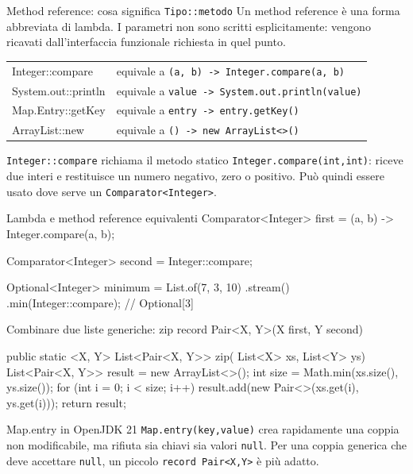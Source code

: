 ﻿\documentclass[10pt,a4paper]{article}
\newcommand{\cmd}[1]{\texttt{#1}}
\begin{document}
\begin{concept}{Method reference: cosa significa \texttt{Tipo::metodo}}
Un method reference è una forma abbreviata di lambda. I parametri non sono
scritti esplicitamente: vengono ricavati dall'interfaccia funzionale richiesta
in quel punto.

\begin{tabularx}{\textwidth}{>{\ttfamily\small}p{4.4cm} X}
Integer::compare & equivale a \cmd{(a, b) -> Integer.compare(a, b)} \\
System.out::println & equivale a \cmd{value -> System.out.println(value)} \\
Map.Entry::getKey & equivale a \cmd{entry -> entry.getKey()} \\
ArrayList::new & equivale a \cmd{() -> new ArrayList<>()} \\
\end{tabularx}

\cmd{Integer::compare} richiama il metodo statico
\cmd{Integer.compare(int,int)}: riceve due interi e restituisce un numero
negativo, zero o positivo. Può quindi essere usato dove serve un
\cmd{Comparator<Integer>}.
\end{concept}

\begin{codebox}{Lambda e method reference equivalenti}
Comparator<Integer> first =
    (a, b) -> Integer.compare(a, b);

Comparator<Integer> second = Integer::compare;

Optional<Integer> minimum = List.of(7, 3, 10)
    .stream()
    .min(Integer::compare); // Optional[3]
\end{codebox}

\begin{codebox}{Combinare due liste generiche: zip}
record Pair<X, Y>(X first, Y second) { }

public static <X, Y> List<Pair<X, Y>> zip(
        List<X> xs,
        List<Y> ys) {
    List<Pair<X, Y>> result = new ArrayList<>();
    int size = Math.min(xs.size(), ys.size());
    for (int i = 0; i < size; i++) {
        result.add(new Pair<>(xs.get(i), ys.get(i)));
    }
    return result;
}
\end{codebox}

\begin{examtrap}{Map.entry in OpenJDK 21}
\cmd{Map.entry(key,value)} crea rapidamente una coppia non modificabile, ma
rifiuta sia chiavi sia valori \cmd{null}. Per una coppia generica che deve
accettare \cmd{null}, un piccolo \cmd{record Pair<X,Y>} è più adatto.
\end{examtrap}
\end{document}
